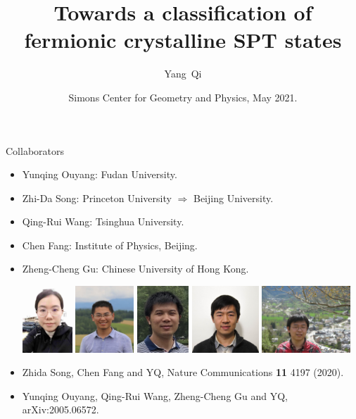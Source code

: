 \documentclass[xcolor=table, 11pt, aspectratio=1610]{beamer}
\title[Space-group SPTs] %
{Towards a classification of fermionic crystalline SPT states}
\author[Y Qi] %
{Yang~Qi}
\institute[Fudan] %
{Department of Physics, Fudan University, Shanghai, China.}
\date{Simons Center for Geometry and Physics, May 2021.}
\begin{document}
\begin{frame}
  \titlepage
\end{frame}

\begin{frame}{Collaborators}
  \begin{itemize}
  \item Yunqing Ouyang: Fudan University.
  \item Zhi-Da Song: Princeton University $\Rightarrow$ Beijing University.
  \item Qing-Rui Wang: Tsinghua University.
  \item Chen Fang: Institute of Physics, Beijing.
  \item Zheng-Cheng Gu: Chinese University of Hong Kong.
    \begin{center}
      \includegraphics[height=2.5cm]{../people/yunqing}
      \includegraphics[height=2.5cm]{../people/zhidasong}
      \includegraphics[height=2.5cm]{../people/qingrui}      
      \includegraphics[height=2.5cm]{../people/chenfang}
      \includegraphics[height=2.5cm]{../people/zhengcheng}
    \end{center}
  \item Zhida Song, Chen Fang and YQ, Nature Communications \textbf{11} 4197 (2020).
  \item Yunqing Ouyang, Qing-Rui Wang, Zheng-Cheng Gu and YQ, arXiv:2005.06572.
\end{itemize}
\end{frame}
\end{document}
